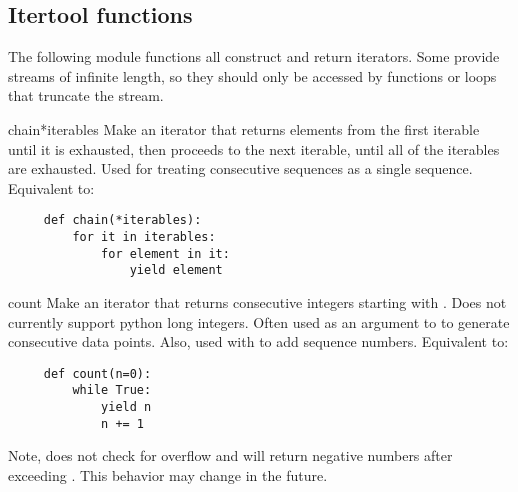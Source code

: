 \begin{seealso}

\end{seealso}


\subsection{Itertool functions \label{itertools-functions}}

The following module functions all construct and return iterators.
Some provide streams of infinite length, so they should only be accessed
by functions or loops that truncate the stream.

\begin{funcdesc}{chain}{*iterables}
  Make an iterator that returns elements from the first iterable until
  it is exhausted, then proceeds to the next iterable, until all of the
  iterables are exhausted.  Used for treating consecutive sequences as
  a single sequence.  Equivalent to:

  \begin{verbatim}
     def chain(*iterables):
         for it in iterables:
             for element in it:
                 yield element
  \end{verbatim}
\end{funcdesc}

\begin{funcdesc}{count}{}
  Make an iterator that returns consecutive integers starting with .
  Does not currently support python long integers.  Often used as an
  argument to  to generate consecutive data points.
  Also, used with  to add sequence numbers.  Equivalent to:

  \begin{verbatim}
     def count(n=0):
         while True:
             yield n
             n += 1
  \end{verbatim}

  Note,  does not check for overflow and will return
  negative numbers after exceeding .  This behavior
  may change in the future.
\end{funcdesc}

